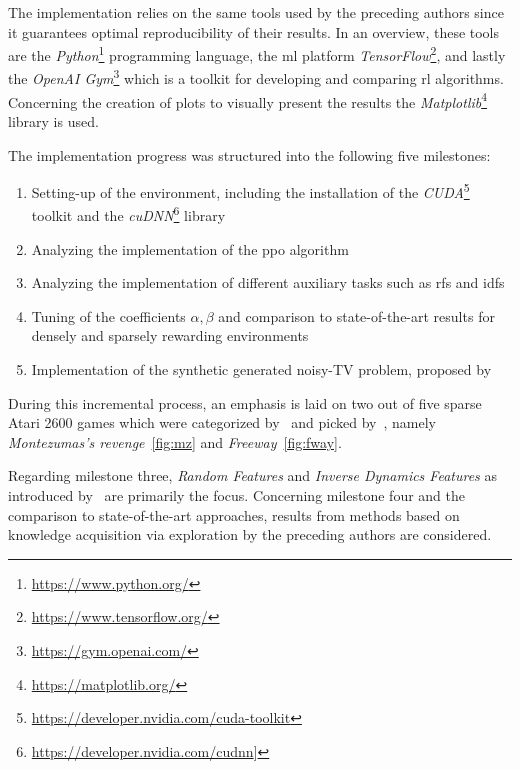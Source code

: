 \documentclass[draft,final]{vutinfth} %
\begin{document}
    The implementation relies on the same tools used by the preceding authors since it guarantees optimal reproducibility of their results.
    In an overview, these tools are the \textit{Python}\footnote{\url{https://www.python.org/}} programming language, the \gls{ml} platform \textit{TensorFlow}\footnote{\url{https://www.tensorflow.org/}}, and lastly the \textit{OpenAI Gym}\footnote{\url{https://gym.openai.com/}} which is a toolkit for developing and comparing \gls{rl} algorithms.
    Concerning the creation of plots to visually present the results the \textit{Matplotlib}\footnote{\url{https://matplotlib.org/}} library is used.

    The implementation progress was structured into the following five milestones:

    \begin{enumerate}
        \item Setting-up of the environment, including the installation of the \textit{CUDA}\footnote{\url{https://developer.nvidia.com/cuda-toolkit}} toolkit and the \textit{cuDNN}\footnote{\url{https://developer.nvidia.com/cudnn}]} library
        \item Analyzing the implementation of the \gls{ppo} algorithm
        \item Analyzing the implementation of different auxiliary tasks such as \glspl{rf} and \glspl{idf}
        \item Tuning of the coefficients $\alpha,\beta$ and comparison to state-of-the-art results for densely and sparsely rewarding environments
        \item Implementation of the synthetic generated noisy-TV problem, proposed by~\cite{burda_large-scale_2018-1}
    \end{enumerate}

    During this incremental process, an emphasis is laid on two out of five sparse Atari 2600 games which were categorized by~\cite{bellemare_unifying_2016} and picked by~\citet{burda_large-scale_2018-1}, namely \textit{Montezumas's revenge}~\eqref{fig:mz} and \textit{Freeway}~\eqref{fig:fway}.

    Regarding milestone three, \textit{Random Features} and \textit{Inverse Dynamics Features} as introduced by~\citet{burda_large-scale_2018-1} are primarily the focus.
    Concerning milestone four and the comparison to state-of-the-art approaches, results from methods based on knowledge acquisition via exploration by the preceding authors are considered.
\end{document}
